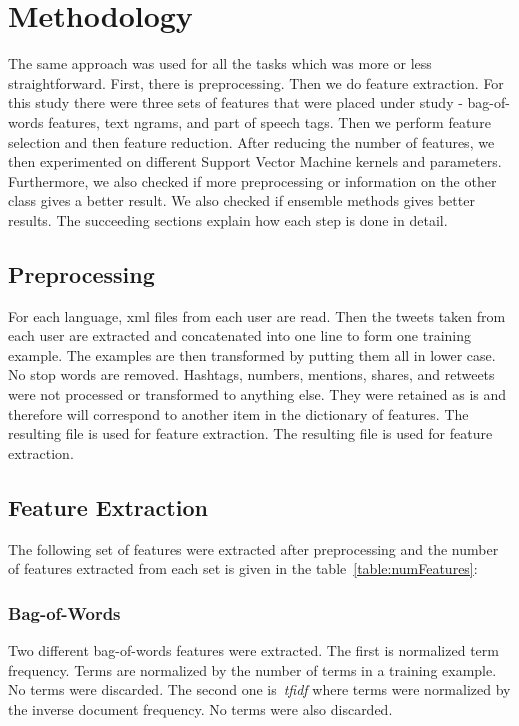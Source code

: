 \documentclass[a4paper]{llncs}
\begin{document}
\section{Methodology}
The same approach was used for all the tasks which was more or less straightforward. First, there is preprocessing. Then we do feature extraction. For this study there were three sets of features that were placed under study - bag-of-words features, text ngrams, and  part of speech tags. Then we perform feature selection and then feature reduction. After reducing the number of features, we then experimented on different Support Vector Machine kernels and parameters. Furthermore, we also checked if more preprocessing or information on the other class gives a better result. We also checked if ensemble methods gives better results. The succeeding sections explain how each step is done in detail. 




\subsection{Preprocessing}
For each language, xml files from each user are read. Then the tweets taken from each user are extracted and concatenated into one line to form one training example. The examples are then transformed by putting them all in lower case. No stop words are removed. Hashtags, numbers, mentions, shares, and retweets were not processed or transformed to anything else. They were retained as is and therefore will correspond to another item in the dictionary of features. The resulting file is used for feature extraction.  The resulting file is used for feature extraction.  

\subsection{Feature Extraction}
The following set of features were extracted after preprocessing and the number of features extracted from each set is given in the table~\ref{table:numFeatures}: 

\subsubsection{Bag-of-Words}

Two different bag-of-words features were extracted. The first is normalized term frequency. Terms are normalized by the number of terms in a training example. No terms were discarded. The second one is~\textit{tfidf} where terms were normalized by the inverse document frequency. No terms were also discarded. 
\end{document}

